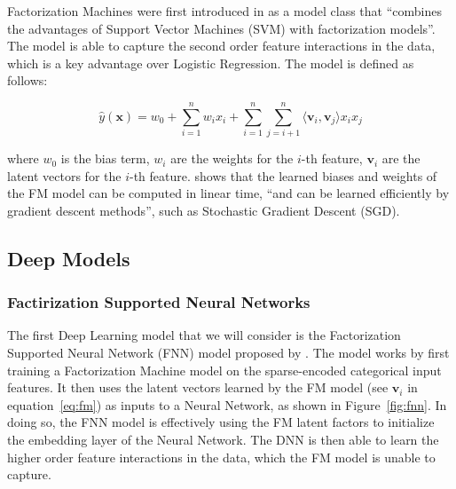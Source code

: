 \documentclass{mldsmsc}
\begin{document}
Factorization Machines were first introduced in \citep{RefWorks:rendle2010factorization} as
a model class that ``combines the advantages of Support Vector Machines (SVM) with factorization models''.
The model is able to capture the second order feature interactions in the data, which is a key advantage over
Logistic Regression. The model is defined as follows:

\begin{equation}
\label{eq:fm}
\hat{y}(\mathbf{x}) = w_0 + \sum_{i=1}^{n} w_i x_i + \sum_{i=1}^{n} \sum_{j=i+1}^{n} \langle \mathbf{v}_i, \mathbf{v}_j \rangle x_i x_j
\end{equation}

where $w_0$ is the bias term, $w_i$ are the weights for the $i$-th feature, $\mathbf{v}_i$ are the latent vectors for the $i$-th feature.
\cite{RefWorks:rendle2010factorization} shows that the learned biases and weights of the FM model can be
computed in linear time, ``and can be learned efficiently by gradient descent methods'', such as Stochastic Gradient Descent (SGD).


\subsection{Deep Models}

\subsubsection{Factirization Supported Neural Networks}

The first Deep Learning model that we will consider is the Factorization Supported
Neural Network (FNN) model proposed by \cite{RefWorks:zhang2016deep}. The model works by first training a Factorization Machine
model on the sparse-encoded categorical input features. It then uses the latent vectors learned by the FM model (see $\mathbf{v}_i$ in equation~\ref{eq:fm})
as inputs to a Neural Network, as shown in Figure~\ref{fig:fnn}. In doing so, the FNN model is effectively using the FM latent factors to initialize the embedding layer of the Neural Network.
The DNN is then able to learn the higher order feature interactions in the data, which the FM model is unable to capture.
\end{document}
